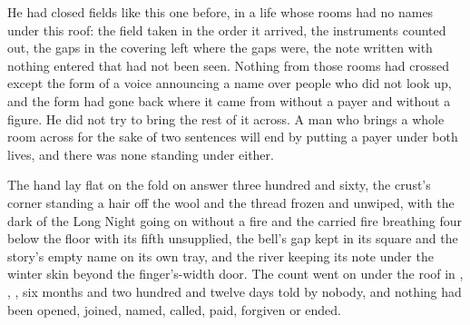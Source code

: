 He had closed fields like this one before, in a life whose rooms had no names under this roof: the field taken in the order it arrived, the instruments counted out, the gaps in the covering left where the gaps were, the note written with nothing entered that had not been seen. Nothing from those rooms had crossed except the form of a voice announcing a name over people who did not look up, and the form had gone back where it came from without a payer and without a figure. He did not try to bring the rest of it across. A man who brings a whole room across for the sake of two sentences will end by putting a payer under both lives, and there was none standing under either.

The hand lay flat on the fold on answer three hundred and sixty, the crust's corner standing a hair off the wool and the thread frozen and unwiped, with the dark of the Long Night going on without a fire and the carried fire breathing four below the floor with its fifth unsupplied, the bell's gap kept in its square and the story's empty name on its own tray, and the river keeping its note under the winter skin beyond the finger's-width door. The count went on under the roof in , , , six months and two hundred and twelve days told by nobody, and nothing had been opened, joined, named, called, paid, forgiven or ended.
